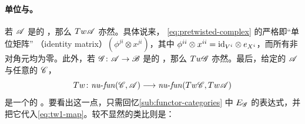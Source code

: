 \paragraph{单位与\trQuasiequivalence。}\label{sub:units-quasi-equivalences}
若 $\mathscr{A}$ 是\trStrictlyUnital{}的 \trACategory，那么 $Tw\mathscr{A}$ 亦然。具体说来，%
\trTwistedComplex{} \eqref{eq:pretwisted-complex} 的严格\trIdentityMorphism{}即“单位矩阵”%
（identity matrix）$(\phi^{ji}\otimes x^{ji})$，其中
$\phi^{ii}\otimes x^{ii}=\mathrm{id}_{V^i}\otimes e_{X^i}$，而所有非对角元均为零。此外，若
$\mathscr{G}\colon\mathscr{A}\to\mathscr{B}$ 是\trStrictlyUnital{}的 \trAFunctor，那么 $Tw\mathscr{G}$
亦然。最后，给定\trStrictlyUnital{}的 $\mathscr{A}$ 与任意的 $\mathscr{C}$，
\begin{equation}\label{eq:tw-nufun-functor}
Tw\colon\mathit{nu}\text{-}\mathit{fun}(\mathscr{C},\mathscr{A})
\longrightarrow\mathit{nu}\text{-}\mathit{fun}(Tw\mathscr{C},Tw\mathscr{A})
\end{equation}
是一个\trStrictlyUnital{}的 \trAFunctor。要看出这一点，只需回忆\cref{sub:functor-categories}
中 $E_{\mathscr{G}}$ 的表达式，并把它代入\eqref{eq:tw1-map}。较不显然的\trCunital{}类比则是：

